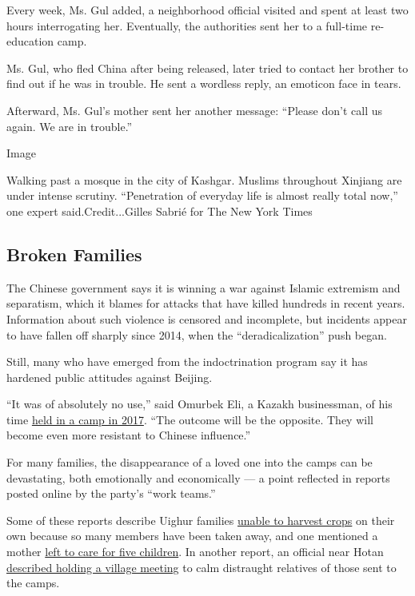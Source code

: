 Every week, Ms. Gul added, a neighborhood official visited and spent at
least two hours interrogating her. Eventually, the authorities sent her
to a full-time re-education camp.

Ms. Gul, who fled China after being released, later tried to contact her
brother to find out if he was in trouble. He sent a wordless reply, an
emoticon face in tears.

Afterward, Ms. Gul's mother sent her another message: ``Please don't
call us again. We are in trouble.''

Image

Walking past a mosque in the city of Kashgar. Muslims throughout
Xinjiang are under intense scrutiny. ``Penetration of everyday life is
almost really total now,'' one expert said.Credit...Gilles Sabrié for
The New York Times

\hypertarget{broken-families}{%
\subsection{Broken Families}\label{broken-families}}

The Chinese government says it is winning a war against Islamic
extremism and separatism, which it blames for attacks that have killed
hundreds in recent years. Information about such violence is censored
and incomplete, but incidents appear to have fallen off sharply since
2014, when the ``deradicalization'' push began.

Still, many who have emerged from the indoctrination program say it has
hardened public attitudes against Beijing.

``It was of absolutely no use,'' said Omurbek Eli, a Kazakh businessman,
of his time
\href{https://www.rfa.org/english/news/uyghur/kazakh-01302018161655.html}{held
in a camp in 2017}. ``The outcome will be the opposite. They will become
even more resistant to Chinese influence.''

For many families, the disappearance of a loved one into the camps can
be devastating, both emotionally and economically --- a point reflected
in reports posted online by the party's ``work teams.''

Some of these reports describe Uighur families
\href{https://www.meipian.cn/12nasvul}{unable to harvest crops} on their
own because so many members have been taken away, and one mentioned a
mother \href{https://www.jianshu.com/p/35d75dd53642}{left to care for
five children}. In another report, an official near Hotan
\href{https://www.meipian.cn/j1ja93p}{described holding a village
meeting} to calm distraught relatives of those sent to the camps.

